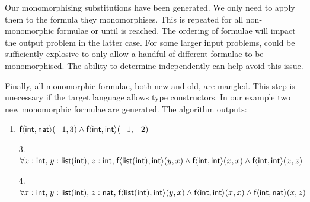 \documentclass[runningheads]{llncs}
\begin{document}
\begin{examplex}
Our monomorphising substitutions have been generated. We only need to apply them to the formula they monomorphises. This is repeated for all non-monomorphic formulae or until \Limit is reached. The ordering of formulae will impact the output problem in the latter case. For some larger input problems, \MonoSubst could be sufficiently explosive to only allow a handful of different formulae to be monomorphised. The ability to determine \SubstLimit independently can help avoid this issue. 

Finally, all monomorphic formulae, both new and old, are mangled. This step is unecessary if the target language allows type constructors. In our example two new monomorphic formulae are generated. The algorithm outputs:
\vspace{-0.5em}
\begin{enumerate}
   \item \(\textsf{f}\langle \textsf{int}, \textsf{nat}\rangle(-1, 3) \land \textsf{f}\langle \textsf{int}, \textsf{int}\rangle(-1, -2)\)
   \item[3.] \(\forall x: \textsf{int}{,}\; y:\textsf{list}(\textsf{int}){,}\; z: \textsf{int}{,}\; \textsf{f}\langle \textsf{list}(\textsf{int}), \textsf{int}\rangle(y, x) \land \textsf{f}\langle \textsf{int}, \textsf{int} \rangle(x, x) \land \textsf{f}\langle \textsf{int}, \textsf{int}\rangle(x, z)\)
   \item[4.] \(\forall x: \textsf{int}{,}\; y:\textsf{list}(\textsf{int}){,}\; z: \textsf{nat}{,}\; \textsf{f}\langle \textsf{list}(\textsf{int}), \textsf{int}\rangle(y, x) \land \textsf{f}\langle \textsf{int}, \textsf{int} \rangle(x, x) \land \textsf{f}\langle \textsf{int}, \textsf{nat}\rangle(x, z)\)
\end{enumerate}

\end{examplex}
\end{document}

